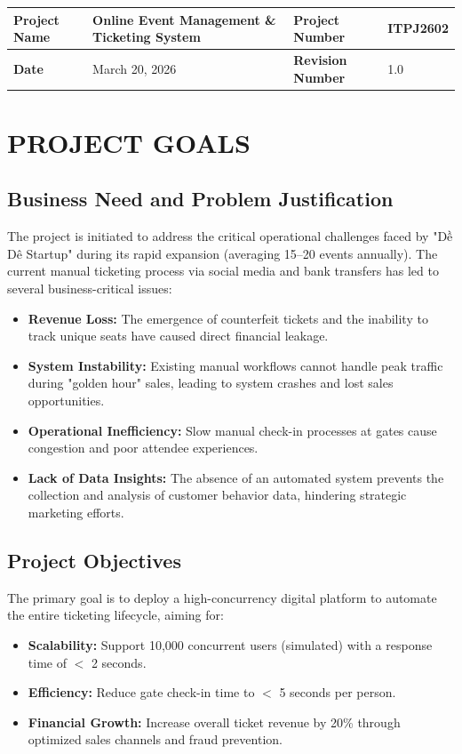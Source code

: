 
\noindent
\begin{tabularx}{\textwidth}{|l|Y|l|Y|}
\hline
\textbf{Project Name} & Online Event Management \& Ticketing System & \textbf{Project Number} & ITPJ2602 \\ \hline
\textbf{Date} & March 20, 2026 & \textbf{Revision Number} & 1.0 \\ \hline
\end{tabularx}

\vspace{2cm}

\chapter{PROJECT GOALS}

\section{Business Need and Problem Justification}
The project is initiated to address the critical operational challenges faced by "Dề Dê Startup" during its rapid expansion (averaging 15–20 events annually). The current manual ticketing process via social media and bank transfers has led to several business-critical issues:
\begin{itemize}
    \item \textbf{Revenue Loss:} The emergence of counterfeit tickets and the inability to track unique seats have caused direct financial leakage.
    \item \textbf{System Instability:} Existing manual workflows cannot handle peak traffic during "golden hour" sales, leading to system crashes and lost sales opportunities.
    \item \textbf{Operational Inefficiency:} Slow manual check-in processes at gates cause congestion and poor attendee experiences.
    \item \textbf{Lack of Data Insights:} The absence of an automated system prevents the collection and analysis of customer behavior data, hindering strategic marketing efforts.
\end{itemize}

\section{Project Objectives}
The primary goal is to deploy a high-concurrency digital platform to automate the entire ticketing lifecycle, aiming for:
\begin{itemize}
    \item \textbf{Scalability:} Support 10,000 concurrent users (simulated) with a response time of $<$ 2 seconds.
    \item \textbf{Efficiency:} Reduce gate check-in time to $<$ 5 seconds per person.
    \item \textbf{Financial Growth:} Increase overall ticket revenue by 20\% through optimized sales channels and fraud prevention.
\end{itemize}

